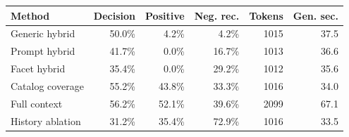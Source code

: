 \begin{tabular}{lrrrrr}
\toprule
Method & Decision & Positive & Neg. rec. & Tokens & Gen. sec. \\
\midrule
Generic hybrid & 50.0\% & 4.2\% & 4.2\% & 1015 & 37.5 \\
Prompt hybrid & 41.7\% & 0.0\% & 16.7\% & 1013 & 36.6 \\
Facet hybrid & 35.4\% & 0.0\% & 29.2\% & 1012 & 35.6 \\
Catalog coverage & 55.2\% & 43.8\% & 33.3\% & 1016 & 34.0 \\
Full context & 56.2\% & 52.1\% & 39.6\% & 2099 & 67.1 \\
History ablation & 31.2\% & 35.4\% & 72.9\% & 1016 & 33.5 \\
\bottomrule
\end{tabular}
